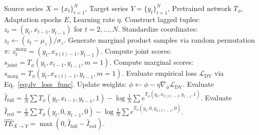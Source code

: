 \begin{algorithm}[!t]
\caption{Amortized Neural Transfer Entropy with Unsupervised Domain Adaptation (ANTE-UDA)}
\label{alg:ante_uda}
\begin{algorithmic}[1]
\REQUIRE Source series $X = \{x_t\}_{t=1}^N$, Target series $Y = \{y_t\}_{t=1}^N$, Pretrained network $T_\phi$, Adaptation epochs $E$, Learning rate $\eta$.
\STATE Construct lagged tuples: $z_t = (y_t, x_{t-1}, y_{t-1})$ for $t = 2, \dots, N$.
\STATE Standardize coordinates: $z_t \leftarrow (z_t - \mu_z) / \sigma_z$.
\STATE Generate marginal product samples via random permutation $\pi$: $z_t^{\text{marg}} = (y_t, x_{\pi(t)-1}, y_{t-1})$.
    \STATE Compute joint scores: $s_{\text{joint}} = T_\phi(y_t, x_{t-1}, y_{t-1}, m=1)$.
    \STATE Compute marginal scores: $s_{\text{marg}} = T_\phi(y_t, x_{\pi(t)-1}, y_{t-1}, m=1)$.
    \STATE Evaluate empirical loss $\mathcal{L}_{\text{DV}}$ via Eq.~\eqref{eq:dv_loss_func}.
    \STATE Update weights: $\phi \leftarrow \phi - \eta \nabla_\phi \mathcal{L}_{\text{DV}}$.
\ENDFOR
\STATE Evaluate $\widehat{I}_{\text{full}} = \frac{1}{N}\sum T_\phi(y_t, x_{t-1}, y_{t-1}, 1) - \log \frac{1}{N}\sum e^{T_\phi(y_t, x_{\pi(t)-1}, y_{t-1}, 1)}$.
\STATE Evaluate $\widehat{I}_{\text{red}} = \frac{1}{N}\sum T_\phi(y_t, 0, y_{t-1}, 0) - \log \frac{1}{N}\sum e^{T_\phi(y_t, 0, y_{\pi(t)-1}, 0)}$.
\ENSURE $\widehat{TE}_{X \to Y} = \max(0, \widehat{I}_{\text{full}} - \widehat{I}_{\text{red}})$.
\end{algorithmic}
\end{algorithm}
